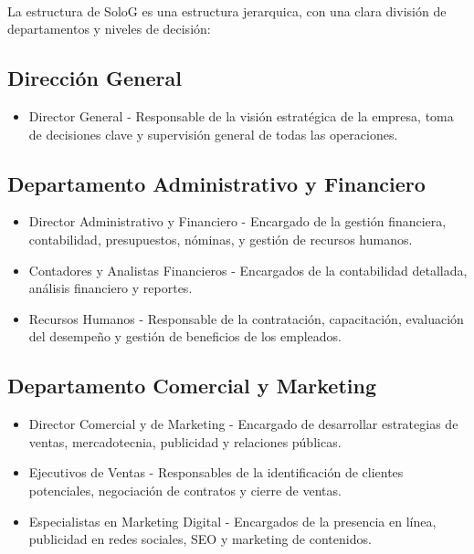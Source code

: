 \documentclass{report}
\begin{document}
          \paragraph*{}
          {
            La estructura de SoloG es una estructura jerarquica, con una clara división de departamentos y niveles de decisión:
          }
          \subsection{Dirección General}
            \begin{itemize}
            \item Director General - Responsable de la visión estratégica de la empresa, toma de decisiones clave y supervisión general de todas las operaciones.
            \end{itemize}
          \subsection{Departamento Administrativo y Financiero}
            \begin{itemize}
            \item Director Administrativo y Financiero - Encargado de la gestión financiera, contabilidad, presupuestos, nóminas, y gestión de recursos humanos.
            \item Contadores y Analistas Financieros - Encargados de la contabilidad detallada, análisis financiero y reportes.
            \item Recursos Humanos - Responsable de la contratación, capacitación, evaluación del desempeño y gestión de beneficios de los empleados.
            \end{itemize}
          \subsection{Departamento Comercial y Marketing}
            \begin{itemize}
            \item Director Comercial y de Marketing - Encargado de desarrollar estrategias de ventas, mercadotecnia, publicidad y relaciones públicas.
            \item Ejecutivos de Ventas - Responsables de la identificación de clientes potenciales, negociación de contratos y cierre de ventas.
            \item Especialistas en Marketing Digital - Encargados de la presencia en línea, publicidad en redes sociales, SEO y marketing de contenidos.
            \end{itemize}
\end{document}
